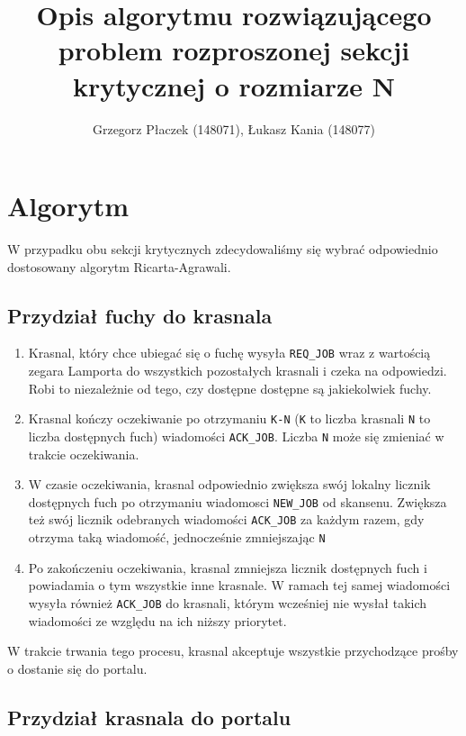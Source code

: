 \documentclass{article}
\author{Grzegorz Płaczek (148071), Łukasz Kania (148077)}
\title{Opis algorytmu rozwiązującego problem rozproszonej sekcji krytycznej o rozmiarze N}
\begin{document}
    \maketitle

    \section{Algorytm}

    W przypadku obu sekcji krytycznych zdecydowaliśmy się wybrać odpowiednio dostosowany algorytm Ricarta-Agrawali.

    \subsection{Przydział fuchy do krasnala}

    \begin{enumerate}
        \item Krasnal, który chce ubiegać się o fuchę wysyła \texttt{REQ\_JOB} wraz z wartością zegara Lamporta do wszystkich pozostałych krasnali i czeka na odpowiedzi.
        Robi to niezależnie od tego, czy dostępne dostępne są jakiekolwiek fuchy.
        \item Krasnal kończy oczekiwanie po otrzymaniu \texttt{K-N} (\texttt{K} to liczba krasnali \texttt{N} to liczba dostępnych fuch) wiadomości \texttt{ACK\_JOB}.
        Liczba \texttt{N} może się zmieniać w trakcie oczekiwania.
        \item W czasie oczekiwania, krasnal odpowiednio zwiększa swój lokalny licznik dostępnych fuch po otrzymaniu wiadomosci \texttt{NEW\_JOB} od skansenu.
        Zwiększa też swój licznik odebranych wiadomości \texttt{ACK\_JOB} za każdym razem, gdy otrzyma taką wiadomość, jednocześnie zmniejszając \texttt{N}
        \item Po zakończeniu oczekiwania, krasnal zmniejsza licznik dostępnych fuch i powiadamia o tym wszystkie inne krasnale.
        W ramach tej samej wiadomości wysyła również \texttt{ACK\_JOB} do krasnali, którym wcześniej nie wysłał takich wiadomości ze względu na ich niższy priorytet.
    \end{enumerate}

    W trakcie trwania tego procesu, krasnal akceptuje wszystkie przychodzące prośby o dostanie się do portalu.

    \subsection{Przydział krasnala do portalu}
\end{document}

